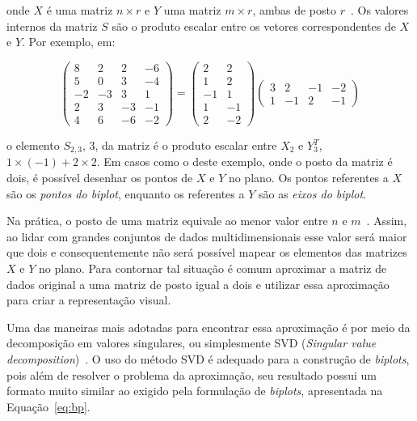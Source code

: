 \noindent onde $X$ é uma matriz $n \times r$ e $Y$ uma matriz $m
\times r$, ambas de posto $r$~\cite{Gabriel1971}. Os valores
internos da matriz $S$ são o produto escalar entre os
vetores correspondentes de $X$ e $Y$. Por exemplo, em:

\begin{equation}
    \left( \begin{array}{rrrr}
        8 &  2 &  2 & -6 \\
        5 &  0 &  3 & -4 \\
       -2 & -3 &  3 &  1 \\
            2 &  3 & -3 & -1 \\
        4 &  6 & -6 & -2\end{array}
\right) = \left( \begin{array}{rr}
         2 & 2 \\
         1 & 2 \\
        -1 & 1 \\
         1 & -1 \\
         2 & -2\end{array} 
\right) \left( \begin{array}{rrrr}
        3 &  2 &-1 & -2 \\
    1 & -1 & 2 & -1 \end{array} 
\right)
\end{equation}

\noindent o elemento $S_{2,3}$, 3, da matriz é o
produto escalar entre $X_2$ e $Y^T_3$, $1 \times \left( -1
\right) + 2 \times 2$. Em casos como o deste
exemplo, onde o posto da matriz é dois, é possível desenhar os
pontos de $X$ e $Y$ no plano. Os pontos referentes a $X$ são
os \emph{pontos do biplot}, enquanto os referentes a $Y$ são
as \emph{eixos do biplot}.

Na prática, o posto de uma matriz equivale ao menor valor
entre $n$ e $m$~\cite{Greenacre2010}. Assim, ao lidar com
grandes conjuntos de dados multidimensionais esse valor será
maior que dois e consequentemente não será possível mapear
os elementos das matrizes $X$ e $Y$ no plano. Para contornar
tal situação é comum aproximar a matriz de dados original a
uma matriz de posto igual a dois e utilizar essa aproximação
para criar a representação visual.

Uma das maneiras mais adotadas para encontrar essa
aproximação é por meio da decomposição em valores
singulares, ou simplesmente SVD (\emph{Singular value
decomposition})~\cite{Kalman1996}. O uso do método SVD é
adequado para a construção de \emph{biplots}, pois além de
resolver o problema da aproximação, seu resultado possui
um formato muito similar ao exigido pela formulação de
\emph{biplots},
apresentada na Equação~\ref{eq:bp}.

